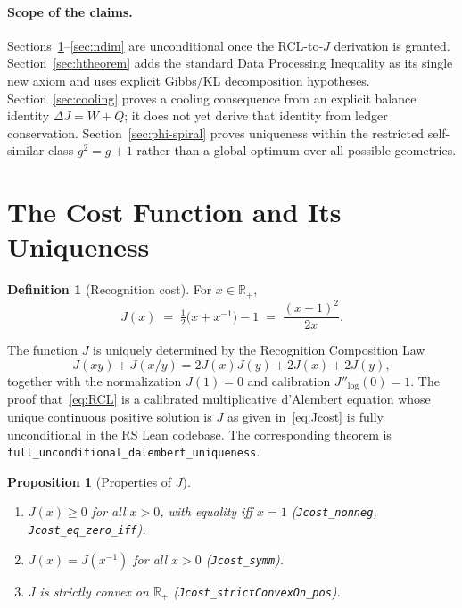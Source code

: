 \documentclass[11pt,a4paper]{article}
\newtheorem{proposition}[theorem]{Proposition}
\theoremstyle{definition}
\newtheorem{definition}[theorem]{Definition}
\newcommand{\Jc}{J}
\newcommand{\code}[1]{\texttt{\small #1}}
\begin{document}
\paragraph{Scope of the claims.}
Sections~\ref{sec:cost}--\ref{sec:ndim} are unconditional once the RCL-to-$\Jc$
derivation is granted.  Section~\ref{sec:htheorem} adds the standard Data
Processing Inequality as its single new axiom and uses explicit Gibbs/KL
decomposition hypotheses.  Section~\ref{sec:cooling} proves a cooling
consequence from an explicit balance identity $\Delta\Jc = W + Q$; it does not
yet derive that identity from ledger conservation.  Section~\ref{sec:phi-spiral}
proves uniqueness within the restricted self-similar class $g^2 = g+1$ rather
than a global optimum over all possible geometries.

\section{The Cost Function and Its Uniqueness}
\label{sec:cost}

\begin{definition}[Recognition cost]
For $x \in \mathbb{R}_+$,
\begin{equation}\label{eq:Jcost}
  \Jc(x) \;=\; \tfrac{1}{2}\bigl(x + x^{-1}\bigr) - 1
         \;=\; \frac{(x-1)^2}{2x}.
\end{equation}
\end{definition}

The function $\Jc$ is uniquely determined by the Recognition Composition Law
\begin{equation}\label{eq:RCL}
  \Jc(xy) + \Jc(x/y) = 2\Jc(x)\Jc(y) + 2\Jc(x) + 2\Jc(y),
\end{equation}
together with the normalization $\Jc(1)=0$ and calibration $\Jc''_{\log}(0)=1$.
The proof that~\eqref{eq:RCL} is a calibrated multiplicative d'Alembert equation
whose unique continuous positive solution is $\Jc$ as given
in~\eqref{eq:Jcost} is fully unconditional in the RS Lean codebase.  The
corresponding theorem is
\code{full\_unconditional\_dalembert}\allowbreak\code{\_uniqueness}.

\begin{proposition}[Properties of $\Jc$]\label{prop:J-props}
\quad
\begin{enumerate}[label=(\alph*)]
  \item $\Jc(x) \ge 0$ for all $x > 0$, with equality iff $x = 1$
    \textup{(\code{Jcost\_nonneg}, \code{Jcost\_eq\_zero\_iff})}.
  \item $\Jc(x) = \Jc(x^{-1})$ for all $x > 0$
    \textup{(\code{Jcost\_symm})}.
  \item $\Jc$ is strictly convex on $\mathbb{R}_+$
    \textup{(\code{Jcost\_strictConvexOn\_pos})}.
\end{enumerate}
\end{proposition}
\end{document}
